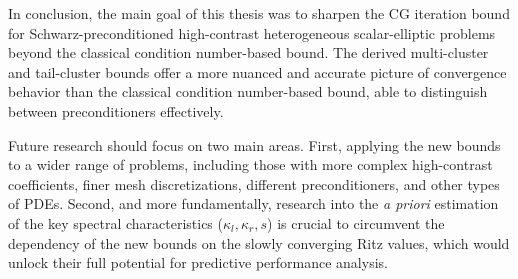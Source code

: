 In conclusion, the main goal of this thesis was to sharpen the CG iteration bound for Schwarz-preconditioned high-contrast heterogeneous scalar-elliptic problems beyond the classical condition number-based bound. The derived multi-cluster and tail-cluster bounds offer a more nuanced and accurate picture of convergence behavior than the classical condition number-based bound, able to distinguish between preconditioners effectively.

Future research should focus on two main areas. First, applying the new bounds to a wider range of problems, including those with more complex high-contrast coefficients, finer mesh discretizations, different preconditioners, and other types of PDEs. Second, and more fundamentally, research into the \textit{a priori}  estimation of the key spectral characteristics ($\kappa_l, \kappa_r, s$) is crucial to circumvent the dependency of the new bounds on the slowly converging Ritz values, which would unlock their full potential for predictive performance analysis.




